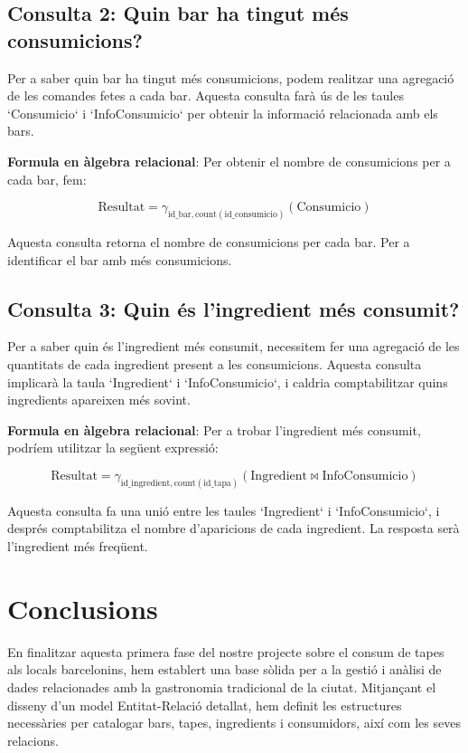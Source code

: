 \documentclass[12pt,a4paper]{article}
\begin{document}
\subsection{Consulta 2: Quin bar ha tingut més consumicions?}

Per a saber quin bar ha tingut més consumicions, podem realitzar una agregació de les comandes fetes a cada bar. Aquesta consulta farà ús de les taules `Consumicio` i `InfoConsumicio` per obtenir la informació relacionada amb els bars.

\textbf{Formula en àlgebra relacional}: 
Per obtenir el nombre de consumicions per a cada bar, fem:

\[
\text{Resultat} = \gamma_{\text{id\_bar}, \text{count}(\text{id\_consumicio})} (\text{Consumicio})
\]

Aquesta consulta retorna el nombre de consumicions per cada bar. Per a identificar el bar amb més consumicions.

\subsection{Consulta 3: Quin és l'ingredient més consumit?}

Per a saber quin és l'ingredient més consumit, necessitem fer una agregació de les quantitats de cada ingredient present a les consumicions. Aquesta consulta implicarà la taula `Ingredient` i `InfoConsumicio`, i caldria comptabilitzar quins ingredients apareixen més sovint.

\textbf{Formula en àlgebra relacional}: 
Per a trobar l'ingredient més consumit, podríem utilitzar la següent expressió:

\[
\text{Resultat} = \gamma_{\text{id\_ingredient}, \text{count}(\text{id\_tapa})} (\text{Ingredient} \bowtie \text{InfoConsumicio})
\]

Aquesta consulta fa una unió entre les taules `Ingredient` i `InfoConsumicio`, i després comptabilitza el nombre d'aparicions de cada ingredient. La resposta serà l'ingredient més freqüent.

\section{Conclusions}

En finalitzar aquesta primera fase del nostre projecte sobre el consum de tapes als locals barcelonins, hem establert una base sòlida per a la gestió i anàlisi de dades relacionades amb la gastronomia tradicional de la ciutat. Mitjançant el disseny d’un model Entitat-Relació detallat, hem definit les estructures necessàries per catalogar bars, tapes, ingredients i consumidors, així com les seves relacions.
\end{document}
